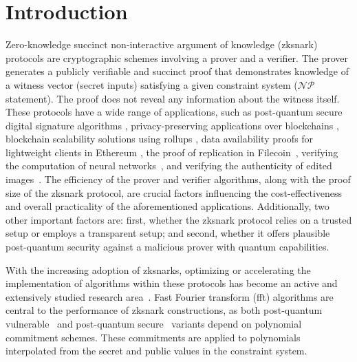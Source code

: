 \chapter{Introduction} \label{ch:Intro}
Zero-knowledge succinct non-interactive argument of knowledge (\gls{zksnark}) protocols are cryptographic schemes involving a prover and a verifier. The prover generates a publicly verifiable and succinct proof that demonstrates knowledge of a witness vector (secret inputs) satisfying a given constraint system ($\mathcal{NP}$ statement). The proof does not reveal any information about the witness itself. These protocols have a wide range of applications, such as post-quantum secure digital signature algorithms \cite{faest2023,picnic2017,Preon2023,picnic2018}, privacy-preserving applications over blockchains \cite{zcash-proc,Hawk,ZeeStar,ZEXE,williamson2018aztec}, blockchain scalability solutions using rollups \cite{Arun2024Jolt,Chaliasos2024,Thibault2022,PolygonZKEVM,zkSync,STARKnet}, data availability proofs for lightweight clients in Ethereum \cite{HallAndersen2024FRIDA}, the proof of replication in Filecoin~\cite{benet2017proof}, verifying the computation of neural networks~\cite{Haochen2024zkLLM,Chen2024ZKML,Weng2021Mystique}, and verifying the authenticity of edited images~\cite{Dziembowski2025VIMz}. 
The efficiency of the prover and verifier algorithms, along with the proof size of the  \gls{zksnark} protocol, are crucial factors influencing the cost-effectiveness and overall practicality of the aforementioned applications. Additionally, two other important factors are: first, whether the \gls{zksnark} protocol relies on a trusted setup or employs a transparent setup; and second, whether it offers plausible post-quantum security against a malicious prover with quantum capabilities.

With the increasing adoption of \glspl{zksnark}, optimizing or accelerating the implementation of algorithms within these protocols has become an active and extensively studied research area~\cite{ECFFT1_2023,ECFFT_2022,Diamond2023Towers,CHES:LuoFuGong23,Ji2024GPU,Jandhyala2024AirFRI}. Fast Fourier transform (\gls{fft}) algorithms are central to the performance of \gls{zksnark} constructions, as both post-quantum vulnerable~\cite{Groth2016,Marlin2020,Bulletproofs2018,Gabizon2019PLONK,halo2-book} and post-quantum secure~\cite{Ames2017Ligero,Ben-Sasson2018STARK,Aurora2019,Chiesa2020Fractal,Polaris} variants depend on polynomial commitment schemes. These commitments are applied to polynomials interpolated from the secret and public values in the constraint system.

